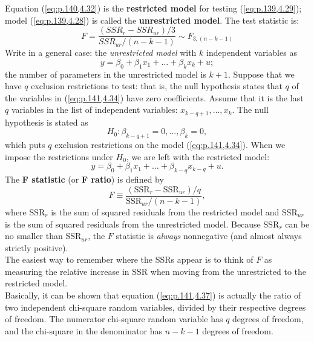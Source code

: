 \documentclass[a4paper, 10pt]{article}
\theoremstyle{definition}	%
\begin{document}
Equation (\ref{eq:p.140,4.32}) is the \textbf{restricted model} for testing (\ref{eq:p.139,4.29}); model (\ref{eq:p.139,4.28}) is called the \textbf{unrestricted model}. The test statistic is:
\begin{equation*}
    F = \frac{(SSR_r - SSR_{ur})/3}{SSR_{ur}/(n-k-1)} \sim F_{3,(n-k-1)}
\end{equation*}
Write in a general case: the \textit{unrestricted model} with $k$ independent variables as
\begin{equation}
    y = \beta_0 + \beta_1 x_1 + \dots + \beta_k x_k + u; \label{eq:p.141,4.34}
\end{equation}
the number of parameters in the unrestricted model is $k + 1$. Suppose that we have $q$ exclusion restrictions to test: that is, the null hypothesis states that $q$ of the variables in (\ref{eq:p.141,4.34}) have zero coefficients. Assume that it is the last $q$ variables in the list of independent variables: $x_{k-q+1}, \dots, x_k$. The null hypothesis is stated as
\begin{equation}
    H_0: \beta_{k-q+1} = 0, \dots, \beta_k = 0, \label{eq:p.141,4.35}
\end{equation}
which puts $q$ exclusion restrictions on the model (\ref{eq:p.141,4.34}). When we impose the restrictions under $H_0$, we are left with the restricted model:
\begin{equation}
    y = \beta_0 + \beta_1 x_1 + \dots + \beta_{k-q} x_{k-q} + u. \label{eq:p.141,4.36}
\end{equation}
The \textbf{F statistic} (or \textbf{F ratio}) is defined by
\begin{equation}
    F \equiv \frac{(\text{SSR}_r - \text{SSR}_{ur}) / q}{\text{SSR}_{ur} / (n - k - 1)}, \label{eq:p.141,4.37}
\end{equation}
where $\text{SSR}_r$ is the sum of squared residuals from the restricted model and $\text{SSR}_{ur}$ is the sum of squared residuals from the unrestricted model.
Because $\text{SSR}_r$ can be no smaller than $\text{SSR}_{ur}$, the $F$ statistic is \textit{always} nonnegative (and almost always strictly positive).\\
The easiest way to remember where the SSRs appear is to think of $F$ as measuring the relative increase in SSR when moving from the unrestricted to the restricted model.\\
Basically, it can be shown that equation (\ref{eq:p.141,4.37}) is actually the ratio of two independent chi-square random variables, divided by their respective degrees of freedom. The numerator chi-square random variable has $q$ degrees of freedom, and the chi-square in the denominator has $n - k - 1$ degrees of freedom.\\
\end{document}
